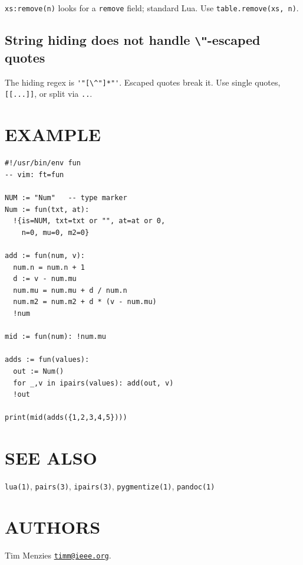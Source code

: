 \documentclass[10pt,twocolumn]{article}
\providecommand{\passthrough}[1]{#1}
\begin{document}
\passthrough{\lstinline!xs:remove(n)!} looks for a
\passthrough{\lstinline!remove!} field; standard Lua. Use
\passthrough{\lstinline!table.remove(xs, n)!}.

\subsection{\texorpdfstring{String hiding does not handle
\texttt{\textbackslash{}"}-escaped
quotes}{String hiding does not handle \textbackslash"-escaped quotes}}\label{string-hiding-does-not-handle--escaped-quotes}

The hiding regex is \passthrough{\lstinline!'"[\^"]*"'!}. Escaped quotes
break it. Use single quotes, \passthrough{\lstinline![[...]]!}, or split
via \passthrough{\lstinline!..!}.

\section{EXAMPLE}\label{example}

\begin{lstlisting}[language=Fun]
#!/usr/bin/env fun
-- vim: ft=fun

NUM := "Num"   -- type marker
Num := fun(txt, at):
  !{is=NUM, txt=txt or "", at=at or 0,
    n=0, mu=0, m2=0}

add := fun(num, v):
  num.n = num.n + 1
  d := v - num.mu
  num.mu = num.mu + d / num.n
  num.m2 = num.m2 + d * (v - num.mu)
  !num

mid := fun(num): !num.mu

adds := fun(values):
  out := Num()
  for _,v in ipairs(values): add(out, v)
  !out

print(mid(adds({1,2,3,4,5})))
\end{lstlisting}

\section{SEE ALSO}\label{see-also}

\passthrough{\lstinline!lua(1)!}, \passthrough{\lstinline!pairs(3)!},
\passthrough{\lstinline!ipairs(3)!},
\passthrough{\lstinline!pygmentize(1)!},
\passthrough{\lstinline!pandoc(1)!}

\section{AUTHORS}\label{authors}

Tim Menzies \href{mailto:timm@ieee.org}{\nolinkurl{timm@ieee.org}}.
\end{document}
